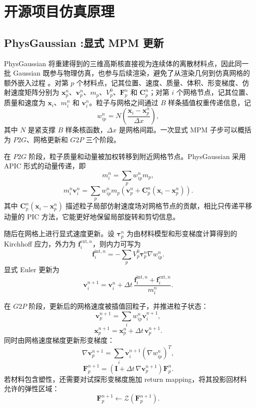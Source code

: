 \documentclass[a4paper]{article}
\begin{document}
\section{开源项目仿真原理}

\subsection{PhysGaussian :显式 MPM 更新}

PhysGaussian 将重建得到的三维高斯核直接视为连续体的离散材料点，因此同一批 Gaussian 既参与物理仿真，也参与后续渲染，避免了从渲染几何到仿真网格的额外嵌入过程 \cite{xie2024physgaussian}。对第 $p$ 个材料点，记其位置、速度、质量、体积、形变梯度、仿射速度矩阵分别为 $\bm{x}_p^n$、$\bm{v}_p^n$、$m_p$、$V_p^0$、$\bm{F}_p^n$ 和 $\bm{C}_p^n$；对第 $i$ 个网格节点，记其位置、质量和速度为 $\bm{x}_i$、$m_i^n$ 和 $\bm{v}_i^n$。粒子与网格之间通过 $B$ 样条插值权重传递信息，记
\[
    w_{ip}^n = N\left(\frac{\bm{x}_i-\bm{x}_p^n}{\Delta x}\right),
\]
其中 $N$ 是紧支撑 $B$ 样条核函数，$\Delta x$ 是网格间距。一次显式 MPM 子步可以概括为 $P2G$、网格更新和 $G2P$ 三个阶段。

在 $P2G$ 阶段，粒子质量和动量被加权转移到附近网格节点。PhysGaussian 采用 APIC 形式的动量传递，即
\[
    m_i^n = \sum_p w_{ip}^n m_p,
\]
\[
    m_i^n \bm{v}_i^n
    =
    \sum_p w_{ip}^n m_p
    \left(
        \bm{v}_p^n
        +
        \bm{C}_p^n(\bm{x}_i-\bm{x}_p^n)
    \right).
\]
其中 $\bm{C}_p^n(\bm{x}_i-\bm{x}_p^n)$ 描述粒子局部仿射速度场对网格节点的贡献，相比只传递平移动量的 PIC 方法，它能更好地保留局部旋转和剪切信息。

随后在网格上进行显式速度更新。设 $\bm{\tau}_p^n$ 为由材料模型和形变梯度计算得到的 Kirchhoff 应力，外力为 $\bm{f}_i^{\mathrm{ext},n}$，则内力可写为
\[
    \bm{f}_i^{\mathrm{int},n}
    =
    -
    \sum_p V_p^0 \bm{\tau}_p^n \nabla w_{ip}^n.
\]
显式 Euler 更新为
\[
    \bm{v}_i^{n+1}
    =
    \bm{v}_i^n
    +
    \Delta t\,
    \frac{
        \bm{f}_i^{\mathrm{int},n}
        +
        \bm{f}_i^{\mathrm{ext},n}
    }{m_i^n}.
\]

在 $G2P$ 阶段，更新后的网格速度被插值回粒子，并推进粒子状态：
\[
    \bm{v}_p^{n+1}
    =
    \sum_i w_{ip}^n \bm{v}_i^{n+1},
\]
\[
    \bm{x}_p^{n+1}
    =
    \bm{x}_p^n + \Delta t\,\bm{v}_p^{n+1}.
\]
同时由网格速度梯度更新形变梯度：
\[
    \nabla \bm{v}_p^{n+1}
    =
    \sum_i \bm{v}_i^{n+1}(\nabla w_{ip}^n)^{T},
\]
\[
    \bm{F}_p^{n+1}
    =
    \left(\bm{I}+\Delta t\,\nabla \bm{v}_p^{n+1}\right)\bm{F}_p^n.
\]
若材料包含塑性，还需要对试探形变梯度施加 return mapping，将其投影回材料允许的弹性区域：
\[
    \bm{F}_p^{n+1}
    \leftarrow
    \mathcal{Z}\left(\bm{F}_p^{n+1}\right).
\]
\end{document}
